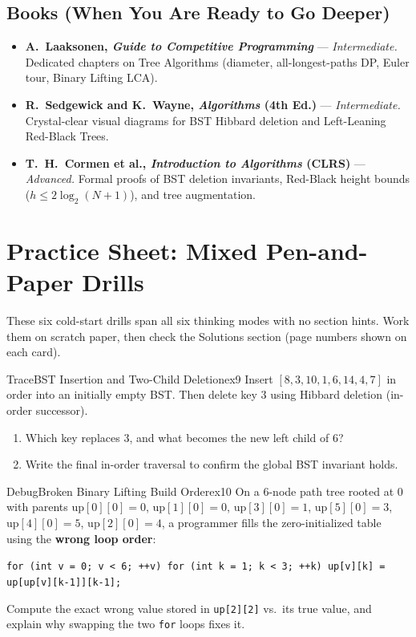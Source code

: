 \documentclass[11pt,a4paper]{article}
\theoremstyle{definition}
\begin{document}
\subsection*{Books (When You Are Ready to Go Deeper)}
\begin{itemize}
    \item \textbf{A.\ Laaksonen, \emph{Guide to Competitive Programming}} --- \emph{Intermediate.} Dedicated chapters on Tree Algorithms (diameter, all-longest-paths DP, Euler tour, Binary Lifting LCA).
    \item \textbf{R.\ Sedgewick and K.\ Wayne, \emph{Algorithms} (4th Ed.)} --- \emph{Intermediate.} Crystal-clear visual diagrams for BST Hibbard deletion and Left-Leaning Red-Black Trees.
    \item \textbf{T.\ H.\ Cormen et al., \emph{Introduction to Algorithms} (CLRS)} --- \emph{Advanced.} Formal proofs of BST deletion invariants, Red-Black height bounds ($h \le 2\log_2(N+1)$), and tree augmentation.
\end{itemize}

\section*{Practice Sheet: Mixed Pen-and-Paper Drills}

These six cold-start drills span all six thinking modes with no section hints. Work them on scratch paper, then check the Solutions section (page numbers shown on each card).

\begin{tryitbox}{Trace}{BST Insertion and Two-Child Deletion}{ex9}
Insert $[8, 3, 10, 1, 6, 14, 4, 7]$ in order into an initially empty BST. Then delete key $3$ using Hibbard deletion (in-order successor).
\begin{enumerate}[itemsep=2pt, topsep=2pt]
    \item Which key replaces $3$, and what becomes the new left child of $6$?
    \item Write the final in-order traversal to confirm the global BST invariant holds.
\end{enumerate}
\end{tryitbox}

\begin{tryitbox}{Debug}{Broken Binary Lifting Build Order}{ex10}
On a 6-node path tree rooted at $0$ with parents $\text{up}[0][0]=0$, $\text{up}[1][0]=0$, $\text{up}[3][0]=1$, $\text{up}[5][0]=3$, $\text{up}[4][0]=5$, $\text{up}[2][0]=4$, a programmer fills the zero-initialized table using the \textbf{wrong loop order}:
\begin{center}
\texttt{for (int v = 0; v < 6; ++v) for (int k = 1; k < 3; ++k) up[v][k] = up[up[v][k-1]][k-1];}
\end{center}
Compute the exact wrong value stored in \texttt{up[2][2]} vs.\ its true value, and explain why swapping the two \texttt{for} loops fixes it.
\end{tryitbox}
\end{document}
